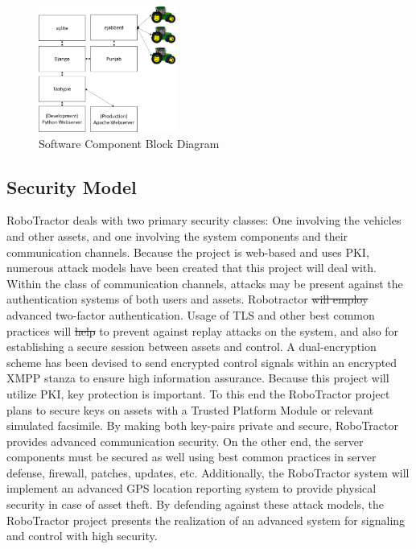 \documentclass[conference,12pt]{IEEEtran}
\providecommand{\DIFaddtex}[1]{{\protect\color{blue}\uwave{#1}}} %
\providecommand{\DIFdeltex}[1]{{\protect\color{red}\sout{#1}}}                      %
\providecommand{\DIFaddbegin}{} %
\providecommand{\DIFaddend}{} %
\providecommand{\DIFdelbegin}{} %
\providecommand{\DIFdelend}{} %
\providecommand{\DIFadd}[1]{\texorpdfstring{\DIFaddtex{#1}}{#1}} %
\providecommand{\DIFdel}[1]{\texorpdfstring{\DIFdeltex{#1}}{}} %
\begin{document}
\begin{figure}
\centering
\includegraphics[width=0.4\textwidth]{SoftwareComponentBlockDiagram.pdf}
\caption{Software Component Block Diagram}
\label{fig:softwarecomponents}
\end{figure}

\subsection{Security Model}
RoboTractor deals with two primary security classes: One involving the vehicles
and other assets, and one involving the system components and their communication channels.
Because the project is web-based and uses PKI, numerous attack models have
been created that this project will deal with. Within the class of communication channels,
attacks may be present against the authentication systems of both users and assets. Robotractor \DIFdelbegin \DIFdel{will employ
}\DIFdelend \DIFaddbegin \DIFadd{currently employs
}\DIFaddend advanced two-factor authentication. Usage of TLS and other best common practices will \DIFdelbegin \DIFdel{help }\DIFdelend \DIFaddbegin \DIFadd{be implemented }\DIFaddend to prevent
against replay attacks on the system, and also for establishing a secure session between assets and control.
A dual-encryption scheme has been devised to send encrypted control signals within an encrypted XMPP stanza
to ensure high information assurance. Because this project will utilize PKI, key protection is important. To this end
the RoboTractor project plans to secure keys on assets with a Trusted Platform Module or relevant simulated facsimile.
By making both key-pairs private and secure, RoboTractor provides advanced communication security.
On the other end, the server components must be secured as well using best common practices in server defense, firewall,
patches, updates, etc. Additionally, the RoboTractor system will implement an advanced GPS location reporting system
to provide physical security in case of asset theft. By defending against these attack models, the RoboTractor project
presents the realization of an advanced system for signaling and control with high security. 
\end{document}
